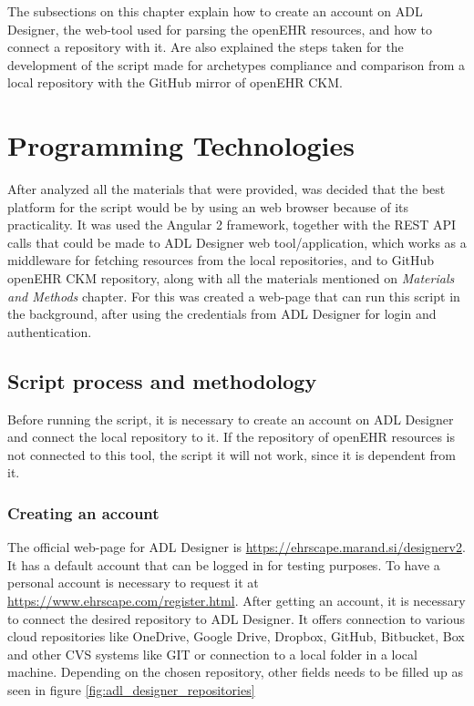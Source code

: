 \documentclass[mim_thesis.tex]{subfiles}
\begin{document}
The subsections on this chapter explain how to create an account on ADL Designer, the web-tool used for parsing the openEHR resources, and how to connect a repository with it. Are also explained the steps taken for the development of the script made for archetypes compliance and comparison from a local repository with the GitHub mirror of openEHR CKM.  


\section{Programming Technologies}
After analyzed all the materials that were provided, was decided that the best platform for the script would be by using an web browser because of its practicality. It was used the Angular 2 framework, together with the REST API calls that could be made to ADL Designer web tool/application, which works as a middleware for fetching resources from the local repositories, and to GitHub openEHR CKM repository, along with all the materials mentioned on \textit{Materials and Methods} chapter. For this was created a web-page that can run this script in the background, after using the credentials from ADL Designer for login and authentication.


\subsection{Script process and methodology}

Before running the script, it is necessary to create an account on ADL Designer and connect the local repository to it. If the repository of openEHR resources is not connected to this tool, the script it will not work, since it is dependent from it.

\subsubsection{Creating an account}
The official web-page for ADL Designer is \url{https://ehrscape.marand.si/designerv2}. It has a default account that can be logged in for testing purposes. To have a personal account is necessary to request it at \url{https://www.ehrscape.com/register.html}.
After getting an account, it is necessary to connect the desired repository to ADL Designer. It offers connection to various cloud repositories like OneDrive, Google Drive, Dropbox, GitHub, Bitbucket, Box and other CVS systems like GIT or connection to a local folder in a local machine. Depending on the chosen repository, other fields needs to be filled up as seen in figure \ref{fig:adl_designer_repositories}
\end{document}
